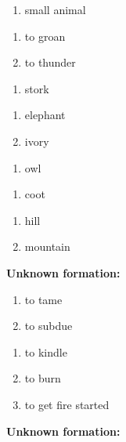 \begin{enumerate}
\item small animal
\end{enumerate}
\begin{enumerate}
\item to groan
\item to thunder
\end{enumerate}
\begin{enumerate}
\item stork
\end{enumerate}
\begin{enumerate}
\item elephant
\item ivory
\end{enumerate}
\begin{enumerate}
\item owl
\end{enumerate}
\begin{enumerate}
\item coot
\end{enumerate}
\begin{enumerate}
\item hill
\item mountain
\end{enumerate}
\noindent\textbf{Unknown formation:}\\

\begin{enumerate}
\item to tame
\item to subdue
\end{enumerate}
\begin{enumerate}
\item to kindle
\item to burn
\item to get fire started
\end{enumerate}
\noindent\textbf{Unknown formation:}\\

